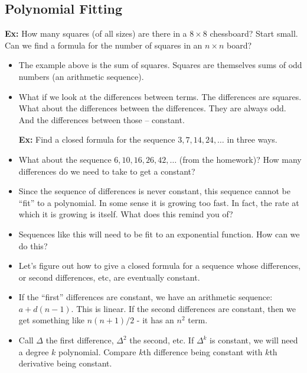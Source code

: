 \documentclass[12pt]{article}
\theoremstyle{plain}
\theoremstyle{definition}
\theoremstyle{remark}
\newcommand{\ex}{\noindent\textbf{Ex:} }
\newcommand{\todayis}[1]{\clearpage{\rhead{\footnotesize #1}}}
\begin{document}
 \todayis{Monday, October 29}

 \subsection*{Polynomial Fitting}
 \ex How many squares (of all sizes) are there in a $8\times 8$ chessboard?  Start small.  Can we find a formula for the number of squares in an $n\times n$ board?
 \begin{itemize}
   \item The example above is the sum of squares.  Squares are themselves sums of odd numbers (an arithmetic sequence).

   \item What if we look at the differences between terms.  The differences are squares.  What about the differences between the differences.  They are always odd.  And the differences between those -- constant.



   \ex Find a closed formula for the sequence $3, 7, 14, 24,\ldots$ in three ways.

   \item What about the sequence $6, 10, 16, 26, 42, \ldots$ (from the homework)?  How many differences do we need to take to get a constant?

   \item Since the sequence of differences is never constant, this sequence cannot be ``fit'' to a polynomial.  In some sense it is growing too fast.  In fact, the rate at which it is growing is itself.  What does this remind you of?

   \item Sequences like this will need to be fit to an exponential function.  How can we do this?

   \item Let's figure out how to give a closed formula for a sequence whose differences, or second differences, etc, are eventually constant.

   \item If the ``first'' differences are constant, we have an arithmetic sequence: $a + d(n-1)$.  This is linear.  If the second differences are constant, then we get something like $n(n+1)/2$ - it has an $n^2$ term.

   \item Call $\Delta$ the first difference, $\Delta^2$ the second, etc.  If $\Delta^k$ is constant, we will need a degree $k$ polynomial.  Compare $k$th difference being constant with $k$th derivative being constant.


\end{itemize}
\end{document}
